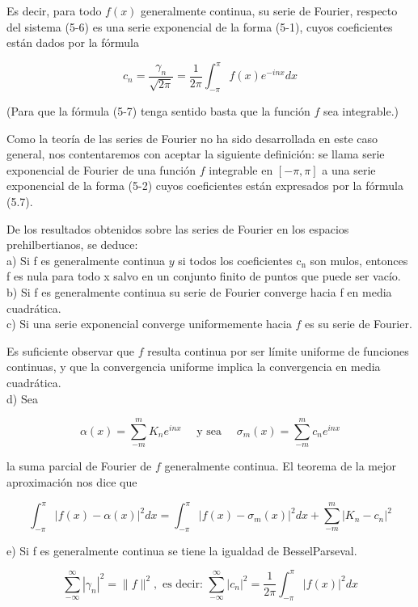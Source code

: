 \documentclass[10pt]{article}
\theoremstyle{plain}
\theoremstyle{definition}
\theoremstyle{remark}
\begin{document}
Es decir, para todo $f(x)$ generalmente continua, su serie de Fourier, respecto del sistema (5-6) es una serie exponencial de la forma (5-1), cuyos coeficientes están dados por la fórmula


\begin{equation*}
c_{n}=\frac{\gamma_{n}}{\sqrt{2 \pi}}=\frac{1}{2 \pi} \int_{-\pi}^{\pi} f(x) e^{-i n x} d x \tag{5-7}
\end{equation*}



(Para que la fórmula (5-7) tenga sentido basta que la función $f$ sea integrable.)

Como la teoría de las series de Fourier no ha sido desarrollada en este caso general, nos contentaremos con aceptar la siguiente definición: se llama serie exponencial de Fourier de una función $f$ integrable en $[-\pi, \pi]$ a una serie exponencial de la forma (5-2) cuyos coeficientes están expresados por la fórmula (5.7).

De los resultados obtenidos sobre las series de Fourier en los espacios prehilbertianos, se deduce:\\
a) Si f es generalmente continua $y$ si todos los coeficientes $\mathrm{c}_{\mathrm{n}}$ son mulos, entonces f es nula para todo x salvo en un conjunto finito de puntos que puede ser vacío.\\
b) Si f es generalmente continua su serie de Fourier converge hacia f en media cuadrática.\\
c) Si una serie exponencial converge uniformemente hacia $f$ es su serie de Fourier.

Es suficiente observar que $f$ resulta continua por ser límite uniforme de funciones continuas, y que la convergencia uniforme implica la convergencia en media cuadrática.\\
d) Sea

$$
\alpha(x)=\sum_{-m}^{m} K_{n} e^{i n x} \quad \text { y sea } \quad \sigma_{m}(x)=\sum_{-m}^{m} c_{n} e^{i n x}
$$

la suma parcial de Fourier de $f$ generalmente continua. El teorema de la mejor aproximación nos dice que

$$
\int_{-\pi}^{\pi}|f(x)-\alpha(x)|^{2} d x=\int_{-\pi}^{\pi}\left|f(x)-\sigma_{m}(x)\right|^{2} d x+\sum_{-m}^{m}\left|K_{n}-c_{n}\right|^{2}
$$

e) Si f es generalmente continua se tiene la igualdad de BesselParseval.

$$
\sum_{-\infty}^{\infty}\left|\gamma_{n}\right|^{2}=\|f\|^{2}, \text { es decir: } \sum_{-\infty}^{\infty}\left|c_{n}\right|^{2}=\frac{1}{2 \pi} \int_{-\pi}^{\pi}|f(x)|^{2} d x
$$
\end{document}
